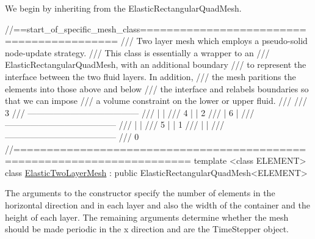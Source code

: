 We begin by inheriting from the {\ttfamily Elastic\+Rectangular\+Quad\+Mesh}.  
\begin{DoxyCodeInclude}
\textcolor{comment}{//==start\_of\_specific\_mesh\_class==========================================}
\textcolor{comment}{/// Two layer mesh which employs a pseudo-solid node-update strategy.}
\textcolor{comment}{}\textcolor{comment}{/// This class is essentially a wrapper to an }
\textcolor{comment}{}\textcolor{comment}{/// ElasticRectangularQuadMesh, with an additional boundary}
\textcolor{comment}{}\textcolor{comment}{/// to represent the interface between the two fluid layers. In addition,}
\textcolor{comment}{}\textcolor{comment}{/// the mesh paritions the elements into those above and below}
\textcolor{comment}{}\textcolor{comment}{/// the interface and relabels boundaries so that we can impose}
\textcolor{comment}{}\textcolor{comment}{/// a volume constraint on the lower or upper fluid.}
\textcolor{comment}{}\textcolor{comment}{///}
\textcolor{comment}{}\textcolor{comment}{///                                 3}
\textcolor{comment}{}\textcolor{comment}{///               ---------------------------------------}
\textcolor{comment}{}\textcolor{comment}{///               |                                     |}
\textcolor{comment}{}\textcolor{comment}{///             4 |                                     | 2}
\textcolor{comment}{}\textcolor{comment}{///               |                 6                   |}
\textcolor{comment}{}\textcolor{comment}{///               ---------------------------------------}
\textcolor{comment}{}\textcolor{comment}{///               |                                     |}
\textcolor{comment}{}\textcolor{comment}{///             5 |                                     | 1}
\textcolor{comment}{}\textcolor{comment}{///               |                                     |}
\textcolor{comment}{}\textcolor{comment}{///               ---------------------------------------}
\textcolor{comment}{}\textcolor{comment}{///                                 0}
\textcolor{comment}{}\textcolor{comment}{//========================================================================}
\textcolor{keyword}{template} <\textcolor{keyword}{class} ELEMENT>
\textcolor{keyword}{class }\hyperlink{classElasticTwoLayerMesh}{ElasticTwoLayerMesh} :
 \textcolor{keyword}{public} ElasticRectangularQuadMesh<ELEMENT>

\end{DoxyCodeInclude}


The arguments to the constructor specify the number of elements in the horizontal direction and in each layer and also the width of the container and the height of each layer. The remaining arguments determine whether the mesh should be made periodic in the x direction and are the {\ttfamily Time\+Stepper} object.


